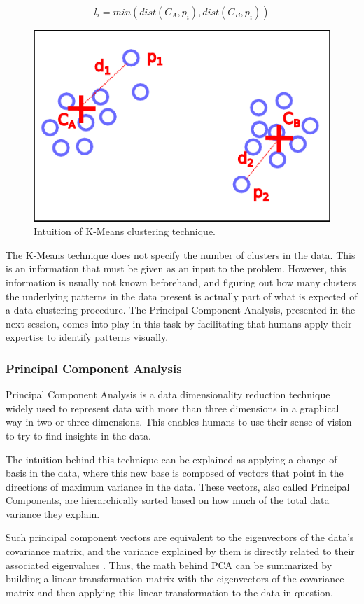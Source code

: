 \documentclass[conference]{IEEEtran}
\begin{document}
\begin{equation}
	\label{eq_kmeans_distance}
	l_{i}=min(dist(C_{A}, p_{i}),dist(C_{B}, p_{i}))
\end{equation}


\begin{figure}[htbp]
\centerline{\includegraphics[width=0.5\columnwidth]{graphics/clu_kmeans_intuition.pdf}}
\caption{Intuition of K-Means clustering technique.}
\label{fig_kmeans_intuition}
\end{figure}

The K-Means technique does not specify the number of clusters in the data. This is an information that must be given as an input to the problem. However, this information is usually not known beforehand, and figuring out how many clusters the underlying patterns in the data present is actually part of what is expected of a data clustering procedure. The Principal Component Analysis, presented in the next session, comes into play in this task by facilitating that humans apply their expertise to identify patterns visually.

\subsubsection{Principal Component Analysis}

Principal Component Analysis is a data dimensionality reduction technique widely used to represent data with more than three dimensions in a graphical way in two or three dimensions. This enables humans to use their sense of vision to try to find insights in the data.

The intuition behind this technique can be explained as applying a change of basis in the data, where this new base is composed of vectors that point in the directions of maximum variance in the data. These vectors, also called Principal Components, are hierarchically sorted based on how much of the total data variance they explain.

Such principal component vectors are equivalent to the eigenvectors of the data's covariance matrix, and the variance explained by them is directly related to their associated eigenvalues \cite{b7}. Thus, the math behind PCA can be summarized by building a linear transformation matrix with the eigenvectors of the covariance matrix and then applying this linear transformation to the data in question.
\end{document}
